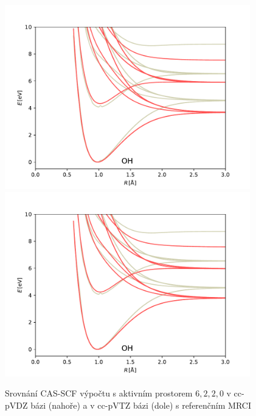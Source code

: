 \begin{figure}
\centering
\includegraphics[width=0.95\textwidth]{../img/OH-MULTI-DZna-6220.pdf}
\includegraphics[width=0.95\textwidth]{../img/OH-MULTI-TZ-6220.pdf}
\caption{Srovnání CAS-SCF výpočtu s aktivním prostorem $6,2,2,0$ v cc-pVDZ bázi 
(nahoře) a v cc-pVTZ bázi (dole) s referenčním MRCI}
\label{gr_OH_6220_na}
\end{figure}
